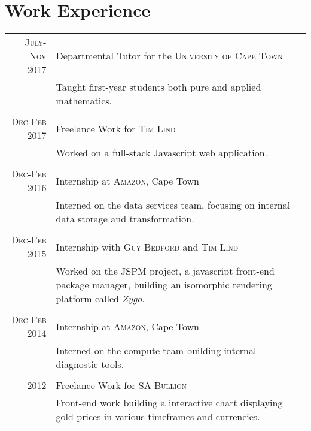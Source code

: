 \documentclass[a4paper,10pt]{article}
\begin{document}
\section{Work Experience}
\begin{tabular}{r|p{11cm}}
    \textsc{July-Nov 2017} & Departmental Tutor for the \textsc{University of Cape Town} \\
                           & \footnotesize{Taught first-year students both pure and applied mathematics.} \\
                             \multicolumn{2}{c}{} \\

    \textsc{Dec-Feb 2017} & Freelance Work for \textsc{Tim Lind} \\
                          & \footnotesize{Worked on a full-stack Javascript web application.} \\
                            \multicolumn{2}{c}{} \\

    \textsc{Dec-Feb 2016} & Internship at \textsc{Amazon}, Cape Town \\
                          & \footnotesize{Interned on the data services team, focusing on internal data storage and transformation.}\\
                            \multicolumn{2}{c}{} \\

    \textsc{Dec-Feb 2015} & Internship with \textsc{Guy Bedford} and \textsc{Tim Lind}\\
                          & \footnotesize{Worked on the JSPM project, a javascript front-end package manager, building an isomorphic rendering platform called \emph{Zygo}.} \\
                            \multicolumn{2}{c}{} \\

    \textsc{Dec-Feb 2014} & Internship at \textsc{Amazon}, Cape Town \\
                          & \footnotesize{Interned on the compute team building internal diagnostic tools.} \\
                            \multicolumn{2}{c}{} \\

    \textsc{2012} & Freelance Work for \textsc{SA Bullion} \\
                  &\footnotesize{Front-end work building a interactive chart displaying gold prices in various timeframes and currencies.}
\end{tabular}
\end{document}
